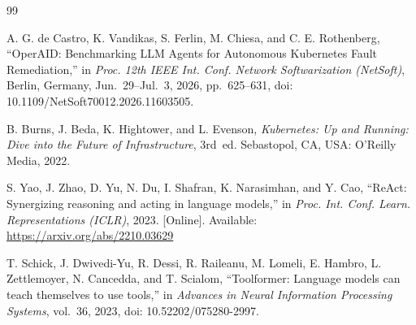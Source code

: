 \documentclass[a4paper, 11pt]{scrartcl}
\begin{document}
\begin{thebibliography}{99}

A. G. de Castro, K. Vandikas, S. Ferlin, M. Chiesa, and C. E. Rothenberg, ``OperAID: Benchmarking LLM Agents for Autonomous Kubernetes Fault Remediation,'' in \emph{Proc. 12th IEEE Int. Conf. Network Softwarization (NetSoft)}, Berlin, Germany, Jun.~29--Jul.~3, 2026, pp.~625--631, doi: 10.1109/NetSoft70012.2026.11603505.

B. Burns, J. Beda, K. Hightower, and L. Evenson, \emph{Kubernetes: Up and Running: Dive into the Future of Infrastructure}, 3rd~ed. Sebastopol, CA, USA: O'Reilly Media, 2022.

S. Yao, J. Zhao, D. Yu, N. Du, I. Shafran, K. Narasimhan, and Y. Cao, ``ReAct: Synergizing reasoning and acting in language models,'' in \emph{Proc. Int. Conf. Learn. Representations (ICLR)}, 2023. [Online]. Available: \url{https://arxiv.org/abs/2210.03629}

T. Schick, J. Dwivedi-Yu, R. Dessi, R. Raileanu, M. Lomeli, E. Hambro, L. Zettlemoyer, N. Cancedda, and T. Scialom, ``Toolformer: Language models can teach themselves to use tools,'' in \emph{Advances in Neural Information Processing Systems}, vol.~36, 2023, doi: 10.52202/075280-2997.

\end{thebibliography}
\end{document}
